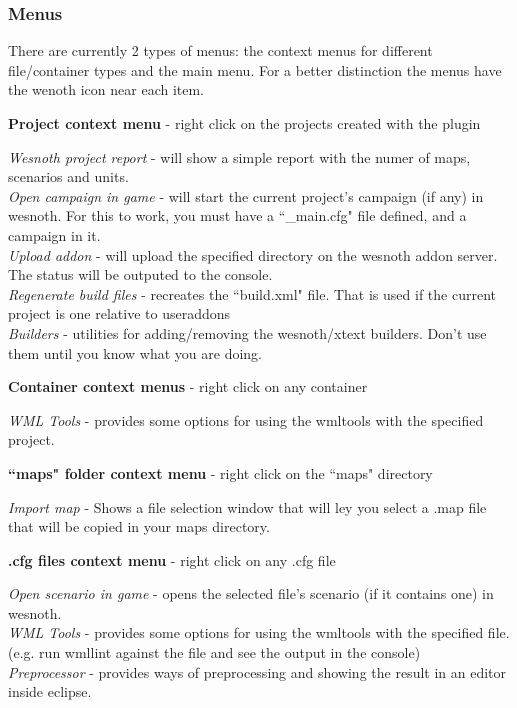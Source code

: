 \documentclass[10pt]{article}
\begin{document}
\subsubsection{Menus}
There are currently 2 types of menus: the context menus for different file/container types and the main menu. For a better distinction the menus have the wenoth icon near each item.

\begin{description}
\item{\textbf{Project context menu}} - right click on the projects created with the plugin

   \textit{Wesnoth project report} - will show a simple report with the numer of maps, scenarios and units.\\
   \textit{Open campaign in game} - will start the current project's campaign (if any) in wesnoth. For this to work, you must have a ``\_main.cfg" file defined, and a campaign in it.\\
   \textit{Upload addon} - will upload the specified directory on the wesnoth addon server. The status will be outputed to the console.\\
   \textit{Regenerate build files} - recreates the ``build.xml" file. That is used if the current project is one relative to useraddons\\
   \textit{Builders} - utilities for adding/removing the wesnoth/xtext builders. Don't use them until you know what you are doing.

\item{\textbf{Container context menus}} - right click on any container

    \textit{WML Tools} - provides some options for using the wmltools with the specified project.

\item{\textbf{``maps" folder context menu}} - right click on the ``maps" directory

   \textit{Import map} - Shows a file selection window that will ley you select a .map file that will be copied in your maps directory.

\item{\textbf{.cfg files context menu}} - right click on any .cfg file

   \textit{Open scenario in game} - opens the selected file's scenario (if it contains one) in wesnoth.\\
   \textit{WML Tools} - provides some options for using the wmltools with the specified file. (e.g. run wmllint against the file and see the output in the console) \\
   \textit{Preprocessor} - provides ways of preprocessing and showing the result in an editor inside eclipse.


\end{description}
\end{document}
